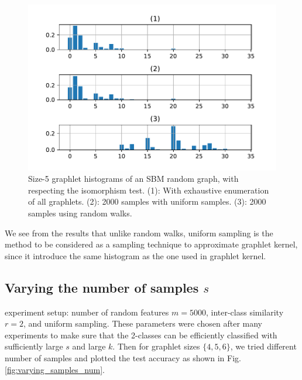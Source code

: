 \begin{figure}[H]
\centering
\includegraphics[scale=0.5]{Dissertation/figs/class0_hist.pdf}
\caption[Graphlet histograms of uniform and random walk sampling techniques]{Size-5 graphlet histograms of an SBM random graph, with respecting the isomorphism test. (1): With exhaustive enumeration of all graphlets. (2): 2000 samples with uniform samples. (3): 2000 samples using random walks. }
\label{fig:graphlet_hist}
\end{figure}
We see from the results that unlike random walks, uniform sampling is the method to be considered as a sampling technique to approximate graphlet kernel, since it introduce the same histogram as the one used in graphlet kernel. 
\subsection{Varying the number of samples $s$}
experiment setup: number of random features $m=5000$, inter-class similarity $r=2$, and uniform sampling. These parameters were chosen after many experiments to make sure that the 2-classes can be efficiently classified with sufficiently large $s$ and large $k$. Then for graphlet sizes $\{4,5,6\}$, we tried different number of samples and plotted the test accuracy as shown in Fig. \ref{fig:varying_samples_num}.

